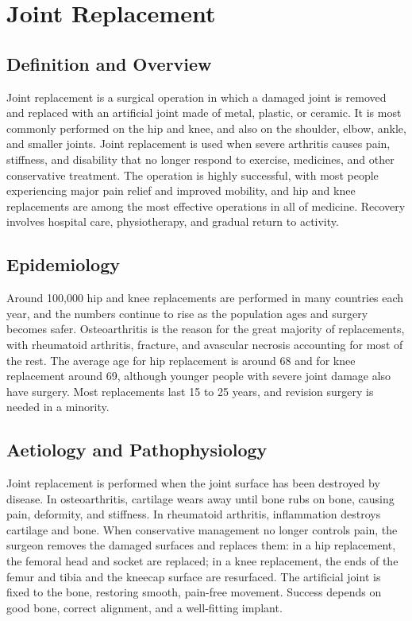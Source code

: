 \chapter{Joint Replacement}

\section*{Definition and Overview}
Joint replacement is a surgical operation in which a damaged joint is removed and replaced with an artificial joint made of metal, plastic, or ceramic. It is most commonly performed on the hip and knee, and also on the shoulder, elbow, ankle, and smaller joints. Joint replacement is used when severe arthritis causes pain, stiffness, and disability that no longer respond to exercise, medicines, and other conservative treatment. The operation is highly successful, with most people experiencing major pain relief and improved mobility, and hip and knee replacements are among the most effective operations in all of medicine. Recovery involves hospital care, physiotherapy, and gradual return to activity.

\section*{Epidemiology}
Around 100,000 hip and knee replacements are performed in many countries each year, and the numbers continue to rise as the population ages and surgery becomes safer. Osteoarthritis is the reason for the great majority of replacements, with rheumatoid arthritis, fracture, and avascular necrosis accounting for most of the rest. The average age for hip replacement is around 68 and for knee replacement around 69, although younger people with severe joint damage also have surgery. Most replacements last 15 to 25 years, and revision surgery is needed in a minority.

\section*{Aetiology and Pathophysiology}
Joint replacement is performed when the joint surface has been destroyed by disease. In osteoarthritis, cartilage wears away until bone rubs on bone, causing pain, deformity, and stiffness. In rheumatoid arthritis, inflammation destroys cartilage and bone. When conservative management no longer controls pain, the surgeon removes the damaged surfaces and replaces them: in a hip replacement, the femoral head and socket are replaced; in a knee replacement, the ends of the femur and tibia and the kneecap surface are resurfaced. The artificial joint is fixed to the bone, restoring smooth, pain-free movement. Success depends on good bone, correct alignment, and a well-fitting implant.

